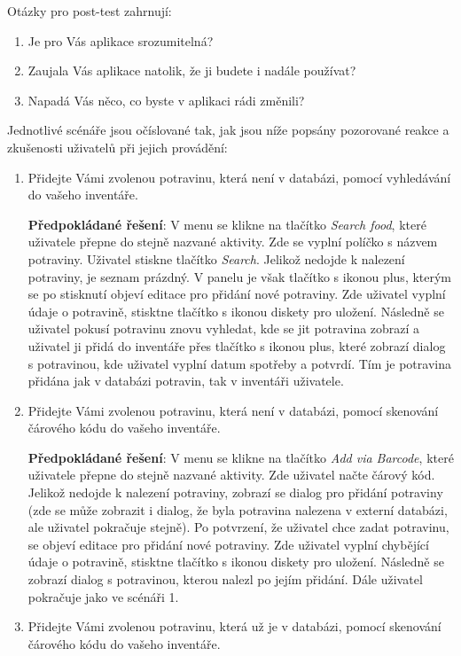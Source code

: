 \documentclass[thesis=B,czech]{FITthesis}[2013/10/20]
\begin{document}
Otázky pro post-test zahrnují:
\begin{enumerate}
  \item Je pro Vás aplikace srozumitelná?
  \item Zaujala Vás aplikace natolik, že ji budete i nadále používat?
  \item Napadá Vás něco, co byste v aplikaci rádi změnili?
\end{enumerate}

Jednotlivé scénáře jsou očíslované tak, jak jsou níže popsány pozorované reakce a zkušenosti uživatelů při jejich provádění:
\begin{enumerate}
  \item Přidejte Vámi zvolenou potravinu, která není v databázi, pomocí vyhledávání do vašeho inventáře.
    
    \textbf{Předpokládané řešení}: V menu se klikne na tlačítko \textit{Search food}, které uživatele přepne do stejně nazvané aktivity. Zde se vyplní políčko s názvem potraviny. Uživatel stiskne tlačítko \textit{Search}. Jelikož nedojde k nalezení potraviny, je seznam prázdný. V panelu je však tlačítko s ikonou plus, kterým se po stisknutí objeví editace pro přidání nové potraviny. Zde uživatel vyplní údaje o potravině, stisktne tlačítko s ikonou diskety pro uložení. Následně se uživatel pokusí potravinu znovu vyhledat, kde se jit potravina zobrazí a uživatel ji přidá do inventáře přes tlačítko s ikonou plus, které zobrazí dialog s potravinou, kde uživatel vyplní datum spotřeby a potvrdí. Tím je potravina přidána jak v databázi potravin, tak v inventáři uživatele.

  \item Přidejte Vámi zvolenou potravinu, která není v databázi, pomocí skenování čárového kódu do vašeho inventáře.
    
    \textbf{Předpokládané řešení}: V menu se klikne na tlačítko \textit{Add via Barcode}, které uživatele přepne do stejně nazvané aktivity. Zde uživatel načte čárový kód. Jelikož nedojde k nalezení potraviny, zobrazí se dialog pro přidání potraviny (zde se může zobrazit i dialog, že byla potravina nalezena v externí databázi, ale uživatel pokračuje stejně). Po potvrzení, že uživatel chce zadat potravinu, se objeví editace pro přidání nové potraviny. Zde uživatel vyplní chybějící údaje o potravině, stisktne tlačítko s ikonou diskety pro uložení. Následně se zobrazí dialog s potravinou, kterou nalezl po jejím přidání. Dále uživatel pokračuje jako ve scénáři 1.
    
  \item Přidejte Vámi zvolenou potravinu, která už je v databázi, pomocí skenování čárového kódu do vašeho inventáře.
    

\end{enumerate}
\end{document}
